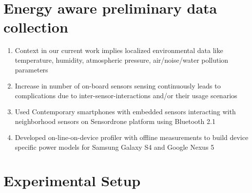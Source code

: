 \documentclass[a0,portrait]{a0poster}
\begin{document}
\begin{multicols}{2}
\section*{Energy aware preliminary data collection}
\color{DarkSlateGray} %
\begin{enumerate}
\item Context in our current work implies localized environmental data like temperature, humidity, atmospheric pressure, air/noise/water pollution parameters
\item Increase in number of on-board sensors sensing continuously leads to complications due to inter-sensor-interactions and/or their usage scenarios
\item Used Contemporary smartphones with embedded sensors interacting with neighborhood sensors on Sensordrone platform using Bluetooth 2.1
\item Developed on-line-on-device profiler with offline measurements to build device specific power models for Samsung Galaxy S4 and Google Nexus 5

\end{enumerate}

\color{SaddleBrown}
\section*{Experimental Setup}

%
%




\end{multicols}
\end{document}
